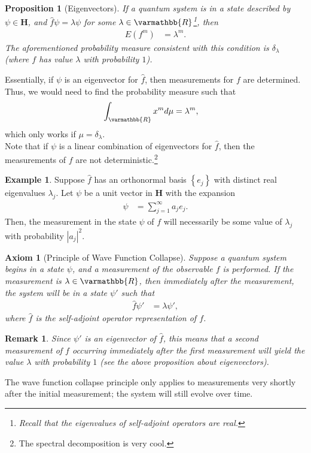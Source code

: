 \documentclass[12pt]{extarticle}
\newtheorem*{remark}{Remark}
\newcommand{\R}{\varmathbb{R}}
\newcommand{\set}[1]{\left\{#1\right\}}
\theoremstyle{plain}
\newtheorem*{axiom}{Axiom}%
\newtheorem*{proposition}{Proposition}%
\theoremstyle{definition}
\newtheorem*{example}{Example}
\theoremstyle{remark}
\begin{document}
  \begin{proposition}[Eigenvectors]
    If a quantum system is in a state described by $\psi\in \mathbf{H}$, and $\hat{f}\psi = \lambda\psi$ for some $\lambda\in \R$\footnote{Recall that the eigenvalues of self-adjoint operators are real.}, then
    \begin{align*}
      E(f^{m}) &= \lambda^{m}.
    \end{align*}
    The aforementioned probability measure consistent with this condition is $\delta_{\lambda}$ (where $f$ has value $\lambda$ with probability $1$).
  \end{proposition}
  Essentially, if $\psi$ is an eigenvector for $\hat{f}$, then measurements for $f$ are determined. Thus, we would need to find the probability measure such that
  \begin{align*}
    \int_{\R}x^{m}d\mu &= \lambda^{m},
  \end{align*}
  which only works if $\mu = \delta_{\lambda}$.\\

  Note that if $\psi$ is a linear combination of eigenvectors for $\hat{f}$, then the measurements of $f$ are not deterministic.\footnote{The spectral decomposition is very cool.}
  \begin{example}
    Suppose $\hat{f}$ has an orthonormal basis $\set{e_j}$ with distinct real eigenvalues $\lambda_j$. Let $\psi$ be a unit vector in $\mathbf{H}$ with the expansion
    \begin{align*}
      \psi &= \sum_{j=1}^{\infty}a_je_j.
    \end{align*}
    Then, the measurement in the state $\psi$ of $f$ will necessarily be some value of $\lambda_j$ with probability $|a_j|^2$.
  \end{example}
  \begin{axiom}[Principle of Wave Function Collapse]
    Suppose a quantum system begins in a state $\psi$, and a measurement of the observable $f$ is performed. If the measurement is $\lambda \in \R$, then immediately after the measurement, the system will be in a state $\psi'$ such that
    \begin{align*}
      \hat{f}\psi' &= \lambda \psi',
    \end{align*}
    where $\hat{f}$ is the self-adjoint operator representation of $f$.
  \end{axiom}
  \begin{remark}
    Since $\psi'$ is an eigenvector of $\hat{f}$, this means that a second measurement of $f$ occurring immediately after the first measurement will yield the value $\lambda$ with probability $1$ (see the above proposition about eigenvectors).
  \end{remark}
  The wave function collapse principle only applies to measurements very shortly after the initial measurement; the system will still evolve over time.
\end{document}
